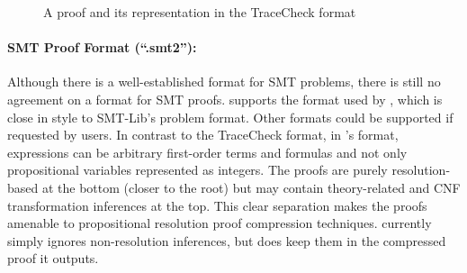 \documentclass{llncs}
\begin{document}
\begin{figure}[h]
	\caption{A proof and its representation in the TraceCheck format}
	\label{TraceCheckProof}
\end{figure}

\vspace{-40pt}

\paragraph{SMT Proof Format (``.smt2''): } Although there is a well-established format for SMT problems, there is still no agreement on a format for SMT proofs. {\skeptik} supports the format used by {\veriT} \cite{BoutonCaminha-B.-de-OliveiraDeharbeFontaine2009veriT:-an-open-trustable-and-efficient-SMT-Solver}, which is close in style to SMT-Lib's problem format. Other formats could be supported if requested by users. In contrast to the TraceCheck format, in {\veriT}'s format, expressions can be arbitrary first-order terms and formulas and not only propositional variables represented as integers. The proofs are purely resolution-based at the bottom (closer to the root) but may contain theory-related and CNF transformation inferences at the top. This clear separation makes the proofs amenable to propositional resolution proof compression techniques. {\skeptik} currently simply ignores non-resolution inferences, but does keep them in the compressed proof it outputs.
\end{document}
